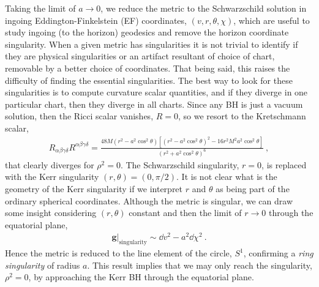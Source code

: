 Taking the limit of $a\to0$, we reduce the metric to the Schwarzschild solution in ingoing Eddington-Finkelstein (EF) coordinates, $(v,r,\theta,\chi)$, which are useful to study ingoing (to the horizon) geodesics and remove the horizon coordinate singularity.
When a given metric has singularities it is not trivial to identify if they are physical singularities or an artifact resultant of choice of chart, removable by a better choice of coordinates. 
That being said, this raises the difficulty of finding the essential singularities.
The best way to look for these singularities is to compute curvature scalar quantities, and if they diverge in one particular chart, then they diverge in all charts.
Since any BH is just a vacuum solution, then the Ricci scalar vanishes, $R=0$, so we resort to the Kretschmann scalar,
\begin{align}
    \label{eq2:KerrKretschmann}
    R_{\alpha\beta\gamma\delta} R^{\alpha\beta\gamma\delta} = \frac{48 M (r^2 - a^2\cos^2\theta) \left[ (r^2 - a^2\cos^2\theta) ^2 - 16 r^2 M^2 a^2\cos^2\theta \right] }{(r^2 + a^2\cos^2\theta)^6} ~,
\end{align}
that clearly diverges for $\rho^2=0$.
The Schwarzschild singularity, $r=0$, is replaced with the Kerr singularity $(r,\theta)=(0,\pi/2)$.
It is not clear what is the geometry of the Kerr singularity if we interpret $r$ and $\theta$ as being part of the ordinary spherical coordinates.
Although the metric is singular, we can draw some insight considering $(r,\theta)$ constant and then the limit of $r\to0$ through the equatorial plane,
\begin{align}
    \label{eq2:KerrSingularity}
    {\bm{g}}\rvert_{\mathrm{singularity}} \sim \dd v^2 - a^2 \dd \chi^2 ~.
\end{align}
Hence the metric is reduced to the line element of the circle, $S^1$, confirming a \emph{ring singularity} of radius $a$.
This result implies that we may only reach the singularity, $\rho^2=0$, by approaching the Kerr BH through the equatorial plane. 

